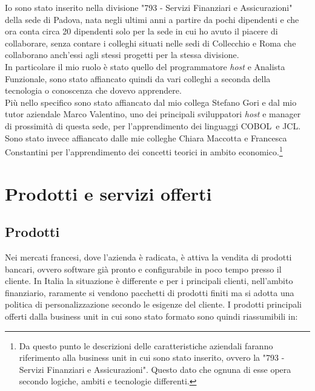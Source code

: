 Io sono stato inserito nella divisione "793 - Servizi Finanziari e Assicurazioni" della sede di Padova, nata negli ultimi anni a partire da pochi dipendenti e che ora conta circa 20 dipendenti solo per la sede in cui ho avuto il piacere di collaborare, senza contare i colleghi situati nelle sedi di Collecchio e Roma che collaborano anch'essi agli stessi progetti per la stessa divisione.\\
In particolare il mio ruolo è stato quello del programmatore \textit{host} e Analista Funzionale, sono stato affiancato quindi da vari colleghi a seconda della tecnologia o conoscenza che dovevo apprendere. \\
Più nello specifico sono stato affiancato dal mio collega Stefano Gori e dal mio tutor aziendale Marco Valentino, uno dei principali sviluppatori \textit{host} e manager di prossimità di questa sede, per l'apprendimento dei linguaggi COBOL\glossario\ e JCL\glossario. Sono stato invece affiancato dalle mie colleghe Chiara Maccotta e Francesca Constantini per l'apprendimento dei concetti teorici in ambito economico.\footnote{Da questo punto le descrizioni delle caratteristiche aziendali faranno riferimento alla business unit in cui sono stato inserito, ovvero la "793 - Servizi Finanziari e Assicurazioni". Questo dato che ognuna di esse opera secondo logiche, ambiti e tecnologie differenti.}%


\section{Prodotti e servizi offerti}
	
	\subsection{Prodotti}
	
	Nei mercati francesi, dove l'azienda è radicata, è attiva la vendita di prodotti bancari, ovvero software già pronto e configurabile in poco tempo presso il cliente. In Italia la situazione è differente e per i principali clienti, nell'ambito finanziario, raramente si vendono pacchetti di prodotti finiti ma si adotta una politica di personalizzazione secondo le esigenze del cliente. I prodotti principali offerti dalla business unit in cui sono stato formato sono quindi riassumibili in:
		
